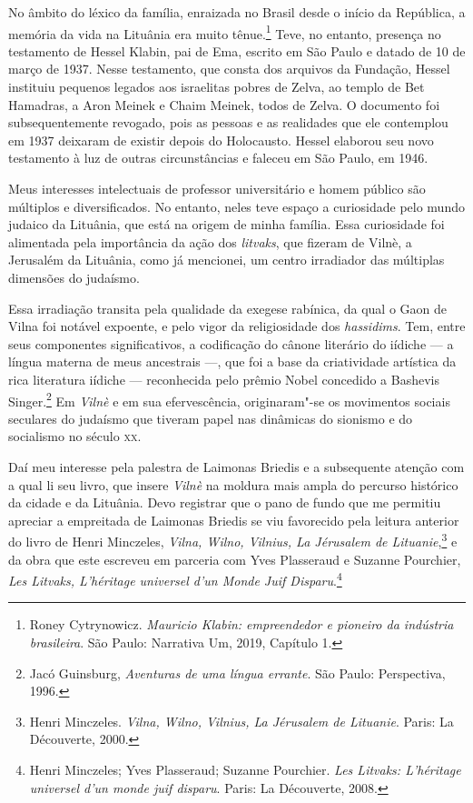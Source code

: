 No âmbito do léxico da família, enraizada no Brasil desde o início da
República, a memória da vida na Lituânia era muito tênue.\footnote{Roney Cytrynowicz. 
\textit{Mauricio Klabin: empreendedor e pioneiro da indústria brasileira}. São Paulo: Narrativa 
Um, 2019, Capítulo 1.} Teve, no entanto, presença no testamento de
Hessel Klabin, pai de Ema, escrito em São Paulo e datado de 10 de março
de 1937. Nesse testamento, que consta dos arquivos da Fundação, Hessel
instituiu pequenos legados aos israelitas pobres de Zelva, ao templo de
Bet Hamadras, a Aron Meinek e Chaim Meinek, todos de Zelva. O documento
foi subsequentemente revogado, pois as pessoas e as realidades que ele
contemplou em 1937 deixaram de existir depois do Holocausto. Hessel
elaborou seu novo testamento à luz de outras circunstâncias e faleceu em
São Paulo, em 1946.

Meus interesses intelectuais de professor universitário e homem público
são múltiplos e diversificados. No entanto, neles teve espaço a
curiosidade pelo mundo judaico da Lituânia, que está na origem de minha
família. Essa curiosidade foi alimentada pela importância da ação dos
\textit{litvaks}, que fizeram de Vilnè, a Jerusalém da Lituânia, como já
mencionei, um centro irradiador das múltiplas dimensões do judaísmo.

Essa irradiação transita pela qualidade da exegese rabínica, da qual o
Gaon de Vilna foi notável expoente, e pelo vigor da religiosidade dos
\textit{hassidims}. Tem, entre seus componentes significativos, a
codificação do cânone literário do iídiche --- a língua materna de meus
ancestrais ---, que foi a base da criatividade artística da rica
literatura iídiche --- reconhecida pelo prêmio Nobel concedido a Bashevis
Singer.\footnote{Jacó Guinsburg, \textit{Aventuras de uma língua
  errante}. São Paulo: Perspectiva, 1996.} Em \textit{Vilnè} e em sua
efervescência, originaram"-se os movimentos sociais seculares do judaísmo
que tiveram papel nas dinâmicas do sionismo e do socialismo no século
\textsc{xx}.

Daí meu interesse pela palestra de Laimonas Briedis e a subsequente
atenção com a qual li seu livro, que insere \textit{Vilnè} na moldura mais ampla
do percurso histórico da cidade e da Lituânia. Devo registrar que o pano
de fundo que me permitiu apreciar a empreitada de Laimonas Briedis se
viu favorecido pela leitura anterior do livro de Henri Minczeles,
\textit{Vilna, Wilno, \textit{Vilnius}, La Jérusalem de Lituanie},\footnote{Henri
  Minczeles. \textit{Vilna, Wilno, \textit{Vilnius}, La Jérusalem de Lituanie}. Paris: La Découverte, 2000.} e da obra que este escreveu em
parceria com Yves Plasseraud e Suzanne Pourchier, \textit{Les Litvaks,
L'héritage universel d'un Monde Juif Disparu}.\footnote{Henri Minczeles;
  Yves Plasseraud; Suzanne Pourchier. \textit{Les Litvaks: L'héritage universel d'un monde juif disparu}. Paris: La Découverte, 2008.}

